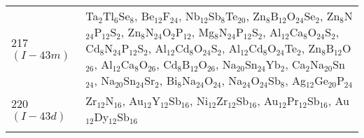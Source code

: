 {\begin{longtable}{p{7.315em}|p{40em}}
    217 $(I-43m)$ & Ta$_{2}$Tl$_{6}$Se$_{8}$, Be$_{12}$F$_{24}$, Nb$_{12}$Sb$_{8}$Te$_{20}$, Zn$_{8}$B$_{12}$O$_{24}$Se$_{2}$, Zn$_{8}$N$_{24}$P$_{12}$S$_{2}$, Zn$_{8}$N$_{24}$O$_{2}$P$_{12}$, Mg$_{8}$N$_{24}$P$_{12}$S$_{2}$, Al$_{12}$Ca$_{8}$O$_{24}$S$_{2}$, Cd$_{8}$N$_{24}$P$_{12}$S$_{2}$, Al$_{12}$Cd$_{8}$O$_{24}$S$_{2}$, Al$_{12}$Cd$_{8}$O$_{24}$Te$_{2}$, Zn$_{8}$B$_{12}$O$_{26}$, Al$_{12}$Ca$_{8}$O$_{26}$, Cd$_{8}$B$_{12}$O$_{26}$, Na$_{20}$Sn$_{24}$Yb$_{2}$, Ca$_{2}$Na$_{20}$Sn$_{24}$, Na$_{20}$Sn$_{24}$Sr$_{2}$, Bi$_{8}$Na$_{24}$O$_{24}$, Na$_{24}$O$_{24}$Sb$_{8}$, Ag$_{12}$Ge$_{20}$P$_{24}$ \\
    220 $(I-43d)$ & Zr$_{12}$N$_{16}$, Au$_{12}$Y$_{12}$Sb$_{16}$, Ni$_{12}$Zr$_{12}$Sb$_{16}$, Au$_{12}$Pr$_{12}$Sb$_{16}$, Au$_{12}$Dy$_{12}$Sb$_{16}$ \\
	 \label{hdwp}\\
    \end{longtable}
}
